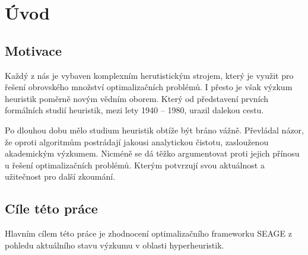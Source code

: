 \chapter{Úvod}
\setcounter{page}{1}

\section{Motivace}
Každý z nás je vybaven komplexním herutistickým strojem, který je využit pro řešení obrovského množství optimalizačních problémů. I přesto je však výzkum heuristik poměrně novým vědním oborem. Který od představení prvních formálních studií heuristik, mezi lety 1940 -- 1980, urazil dalekou cestu.\cite{sorensen2017-1} 

Po dlouhou dobu mělo studium heuristik obtíže být bráno vážně. Převládal názor, že oproti algoritmům postrádají jakousi analytickou čistotu, zaslouženou akademickým výzkumem. Nicméně se dá těžko argumentovat proti jejich přínosu u řešení optimalizačních problémů.\cite{sorensen2017-2} Kterým potvrzují svou aktuálnost a užitečnost pro další zkoumání.





\section{Cíle této práce}

Hlavním cílem této práce je zhodnocení optimalizačního frameworku SEAGE z pohledu aktuálního stavu výzkumu v oblasti hyperheuristik. 

